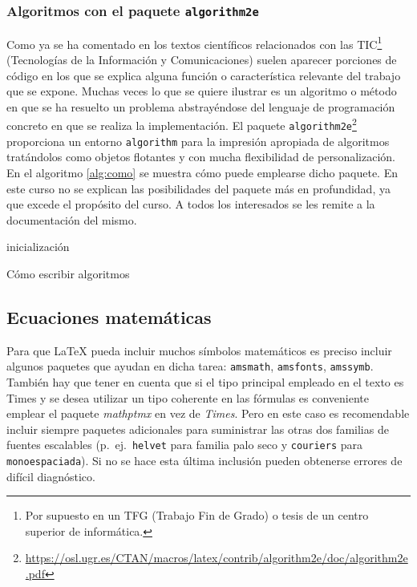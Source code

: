\subsubsection{Algoritmos con el paquete \texttt{algorithm2e}}
Como ya se ha comentado en los textos científicos relacionados con las 
TIC\footnote{Por supuesto en un TFG (Trabajo Fin de Grado) o tesis 
de un centro superior de informática.} (Tecnologías de la Información y 
Comunicaciones) suelen aparecer porciones de código en los que se explica 
alguna función o característica relevante del trabajo que se expone. Muchas 
veces lo que se quiere ilustrar es un algoritmo o método en que se ha 
resuelto un problema abstrayéndose del lenguaje de programación concreto en 
que se realiza la implementación. El paquete 
\texttt{algorithm2e}\footnote{\url{https://osl.ugr.es/CTAN/macros/latex/contrib/algorithm2e/doc/algorithm2e.pdf}}
 proporciona un entorno \texttt{algorithm} para la impresión apropiada de 
algoritmos tratándolos como objetos flotantes y con mucha flexibilidad de 
personalización. En el algoritmo \ref{alg:como} se muestra cómo puede 
emplearse dicho paquete. En este curso no se explican las posibilidades del 
paquete más en profundidad, ya que excede el propósito del curso. A todos los 
interesados se les remite a la documentación del mismo.


\IncMargin{1em}
\begin{algorithm}
\LinesNumbered
\SetAlgoLined


inicialización\;

\caption{Cómo escribir algoritmos}\label{alg:como}
\end{algorithm}\DecMargin{1em}



\subsection{Ecuaciones matemáticas}
Para que \LaTeX{} pueda incluir muchos símbolos matemáticos es preciso incluir algunos paquetes que ayudan en dicha tarea: \texttt{amsmath}, \texttt{amsfonts}, \texttt{amssymb}. También hay que tener en cuenta que si el tipo principal empleado en el texto es Times y se desea utilizar un tipo coherente en las fórmulas es conveniente emplear el paquete \emph{mathptmx} en vez de \emph{Times}. Pero en este caso es recomendable incluir siempre paquetes adicionales para suministrar las otras dos familias de fuentes escalables (p.~ej.\ \texttt{helvet} para familia \textsf{palo seco} y \texttt{couriers} para \texttt{monoespaciada}). Si no se hace esta última inclusión pueden obtenerse errores de difícil diagnóstico.


